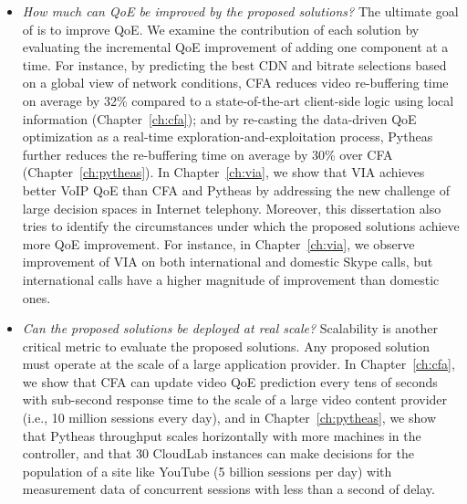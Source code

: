 \begin{itemize}

\item {\em How much can QoE be improved by the proposed solutions?}
The ultimate goal of \ddn is to improve QoE. 
We examine the 
contribution of each solution by evaluating the incremental QoE 
improvement of adding one component at a time. 
For instance, by predicting the best CDN and bitrate selections based on 
a global view of network conditions, CFA reduces video re-buffering time 
on average by 32\% compared to a state-of-the-art client-side logic using 
local information (Chapter~\ref{ch:cfa});
and by re-casting the data-driven QoE optimization as a real-time 
exploration-and-exploitation process, Pytheas further reduces the 
re-buffering time on average by 30\% over CFA (Chapter~\ref{ch:pytheas}).
In Chapter~\ref{ch:via}, we show that VIA achieves better VoIP QoE
than CFA and Pytheas
by addressing the new challenge of large decision spaces in
Internet telephony.
Moreover, this dissertation also tries to identify the circumstances under which
the proposed solutions achieve more QoE improvement.
For instance, in Chapter~\ref{ch:via}, we observe improvement of 
VIA on both international and domestic Skype calls, but international calls
have a higher magnitude of improvement than domestic ones.



\item {\em Can the proposed solutions be deployed at real scale?}
Scalability is another critical metric to evaluate the proposed solutions. 
Any proposed solution must operate at the scale of a large application 
provider.
In Chapter~\ref{ch:cfa}, we show that CFA can update video QoE 
prediction every tens of seconds with sub-second response 
time to the scale of a large video content provider (i.e., 10 million sessions every day), 
and in Chapter~\ref{ch:pytheas}, we show that Pytheas throughput 
scales horizontally with more machines in the controller, and that 
30 CloudLab instances can make decisions for the population of a site
like YouTube (5 billion sessions per day) with measurement data of 
concurrent sessions with less than a second of delay.


\end{itemize}
